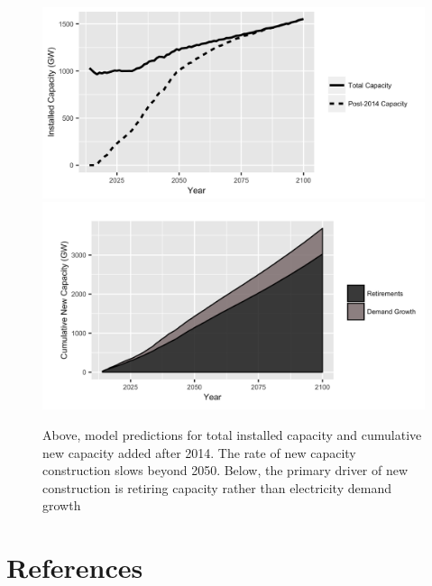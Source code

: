 \documentclass[review]{elsarticle}
\begin{document}
\begin{figure}
\begin{center}
\includegraphics[width=\textwidth]{Fig4_2b.png}
\includegraphics[width=\textwidth]{Fig4_3.png}
\end{center}
\caption{Above, model predictions for total installed capacity and cumulative new capacity added after 2014. The rate of new capacity construction slows beyond 2050. Below, the primary driver of new construction is retiring capacity rather than electricity demand growth}
\end{figure}


\newpage

\nocite{*}

\section{References}


\end{document}
